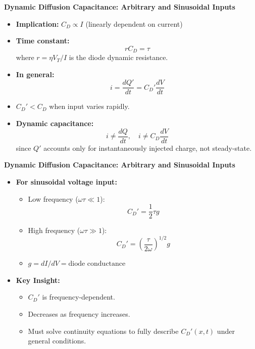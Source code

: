 	\begin{frame}{\textbf{Dynamic Diffusion Capacitance: Arbitrary and Sinusoidal Inputs}}
		\begin{itemize}
			\item \textbf{Implication:} $C_D \propto I$ (linearly dependent on current)
	
			\item \textbf{Time constant:}
			\begin{equation}
			r C_D = \tau \tag{3-29}
			\end{equation}
			where $r = \eta V_T / I$ is the diode dynamic resistance.
			\item \textbf{In general:}
			\begin{equation}
			i = \frac{dQ'}{dt} = C_D' \frac{dV}{dt} \tag{3-30}
			\end{equation}
			\item $C_D' < C_D$ when input varies rapidly.
		
			\item \textbf{Dynamic capacitance:}
			\begin{equation}
			i \neq \frac{dQ}{dt}, \quad i \neq C_D \frac{dV}{dt} \tag{3-31}
			\end{equation}
			since $Q'$ accounts only for instantaneously injected charge, not steady-state.
		\end{itemize}
	\end{frame}	


	\begin{frame}{\textbf{Dynamic Diffusion Capacitance: Arbitrary and Sinusoidal Inputs}}
		\begin{itemize}			
				\item \textbf{For sinusoidal voltage input:}
				\begin{itemize}
					\item Low frequency ($\omega \tau \ll 1$):
					\begin{equation}
					C_D' = \frac{1}{2} \tau g \tag{3-32}
					\end{equation}
					\item High frequency ($\omega \tau \gg 1$):
					\begin{equation}
					C_D' = \left( \frac{\tau}{2\omega} \right)^{1/2} g \tag{3-33}
					\end{equation}
					\item $g = dI/dV = \text{diode conductance}$
				\end{itemize}
			
				\item \textbf{Key Insight:}
				\begin{itemize}
					\item $C_D'$ is frequency-dependent.
					\item Decreases as frequency increases.
					\item Must solve continuity equations to fully describe $C_D'(x,t)$ under general conditions.
				\end{itemize}
		\end{itemize}
	\end{frame}	